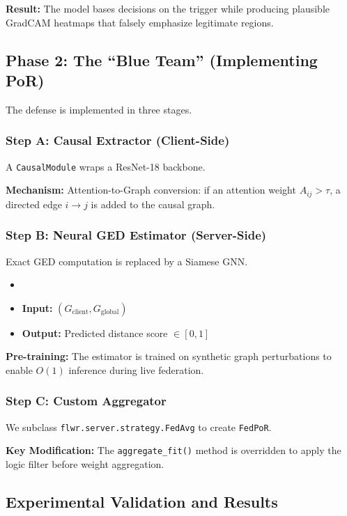 \documentclass[journal]{IEEEtran}
\begin{document}
\textbf{Result:} The model bases decisions on the trigger while producing plausible GradCAM heatmaps that falsely emphasize legitimate regions.

\subsection{Phase 2: The ``Blue Team'' (Implementing PoR)}

The defense is implemented in three stages.

\subsubsection{Step A: Causal Extractor (Client-Side)}

A \texttt{CausalModule} wraps a ResNet-18 backbone.

\textbf{Mechanism:} Attention-to-Graph conversion: if an attention weight $A_{ij} > \tau$, a directed edge $i \rightarrow j$ is added to the causal graph.

\subsubsection{Step B: Neural GED Estimator (Server-Side)}

Exact GED computation is replaced by a Siamese GNN.

\begin{itemize}
\item  \item \textbf{Input:} $(G_{\text{client}}, G_{\text{global}})$
 \item \textbf{Output:} Predicted distance score $\in [0,1]$
\end{itemize}

\textbf{Pre-training:} The estimator is trained on synthetic graph perturbations to enable $O(1)$ inference during live federation.

\subsubsection{Step C: Custom Aggregator}

We subclass \texttt{flwr.server.strategy.FedAvg} to create \texttt{FedPoR}.

\textbf{Key Modification:} The \texttt{aggregate\_fit()} method is overridden to apply the logic filter before weight aggregation.

\subsection{Experimental Validation and Results}
\end{document}
